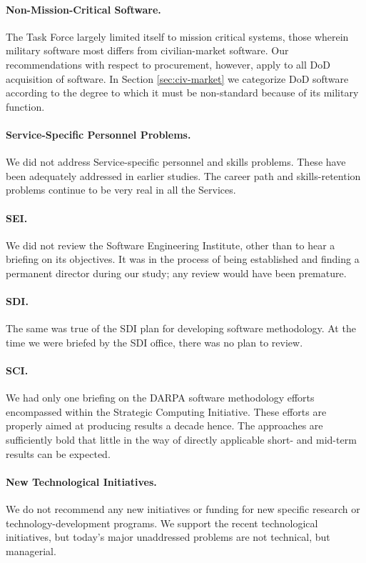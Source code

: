 \documentclass[11pt,final]{article}
\begin{document}
\paragraph{Non-Mission-Critical Software.} The Task Force largely limited
itself to mission critical systems, those wherein military software most
differs from civilian-market software.  Our recommendations with respect to
procurement, however, apply to all DoD acquisition of software. In Section
\ref{sec:civ-market} we categorize DoD software according to the degree to
which it must be non-standard because of its military function.

\paragraph{Service-Specific Personnel Problems.} We did not address
Service-specific personnel and skills problems. These have been adequately
addressed in earlier studies. The career path and skills-retention problems
continue to be very real in all the Services.

\paragraph{SEI.} We did not review the Software Engineering Institute, other
than to hear a briefing on its objectives. It was in the process of being
established and finding a permanent director during our study; any review would
have been premature.

\paragraph{SDI.} The same was true of the SDI plan for developing software
methodology. At the time we were briefed by the SDI office, there was no plan
to review.

\paragraph{SCI.} We had only one briefing on the DARPA software methodology
efforts encompassed within the Strategic Computing Initiative. These efforts
are properly aimed at producing results a decade hence. The approaches are
sufficiently bold that little in the way of directly applicable short- and
mid-term results can be expected.

\paragraph{New Technological Initiatives.} We do not recommend any new
initiatives or funding for new specific research or technology-development
programs. We support the recent technological initiatives, but today’s major
unaddressed problems are not technical, but managerial.
\end{document}

